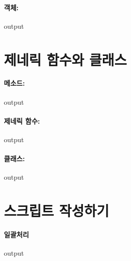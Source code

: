 \documentclass{report}
\begin{document}
\paragraph{객체:}

\begin{Schunk}
\begin{Soutput}
output
\end{Soutput}
\end{Schunk}

\section{제네릭 함수와 클래스}
\paragraph{메소드:}
\begin{Schunk}
\begin{Soutput}
output
\end{Soutput}
\end{Schunk}

\paragraph{제네릭 함수:}
\begin{Schunk}
\begin{Soutput}
output
\end{Soutput}
\end{Schunk}

\paragraph{클래스:}
\begin{Schunk}
\begin{Soutput}
output
\end{Soutput}
\end{Schunk}

\section{스크립트 작성하기}
\paragraph{일괄처리}
\begin{Schunk}
\begin{Soutput}
output
\end{Soutput}
\end{Schunk}
\end{document}

